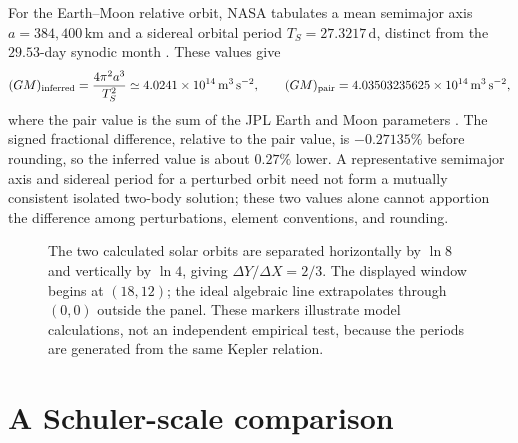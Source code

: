 \documentclass[12pt]{article}
\begin{document}
For the Earth--Moon relative orbit, NASA tabulates a mean semimajor axis $a=384{,}400\,\mathrm{km}$ and a sidereal orbital period $T_S=27.3217\,\mathrm{d}$, distinct from the $29.53$-day synodic month \cite{NSSDCMoon,NSSDCSidereal}. These values give
\begin{equation}
  (GM)_{\rm inferred}=\frac{4\pi^2a^3}{T_S^2}
  \simeq4.0241\times10^{14}\,\mathrm{m^3\,s^{-2}},
  \qquad
  (GM)_{\rm pair}=4.03503235625\times10^{14}\,\mathrm{m^3\,s^{-2}},
  \label{eq:lunar-gm-comparison}
\end{equation}
where the pair value is the sum of the JPL Earth and Moon parameters \cite{JPLParameters}. The signed fractional difference, relative to the pair value, is $-0.27135\%$ before rounding, so the inferred value is about $0.27\%$ lower. A representative semimajor axis and sidereal period for a perturbed orbit need not form a mutually consistent isolated two-body solution; these two values alone cannot apportion the difference among perturbations, element conventions, and rounding.

\begin{figure}[ht]
  \centering
  \caption{The two calculated solar orbits are separated horizontally by $\ln 8$ and vertically by $\ln 4$, giving $\Delta Y/\Delta X=2/3$. The displayed window begins at $(18,12)$; the ideal algebraic line extrapolates through $(0,0)$ outside the panel. These markers illustrate model calculations, not an independent empirical test, because the periods are generated from the same Kepler relation.}
  \label{fig:log-line}
\end{figure}

\section{A Schuler-scale comparison}
\label{sec:schuler}
\end{document}
